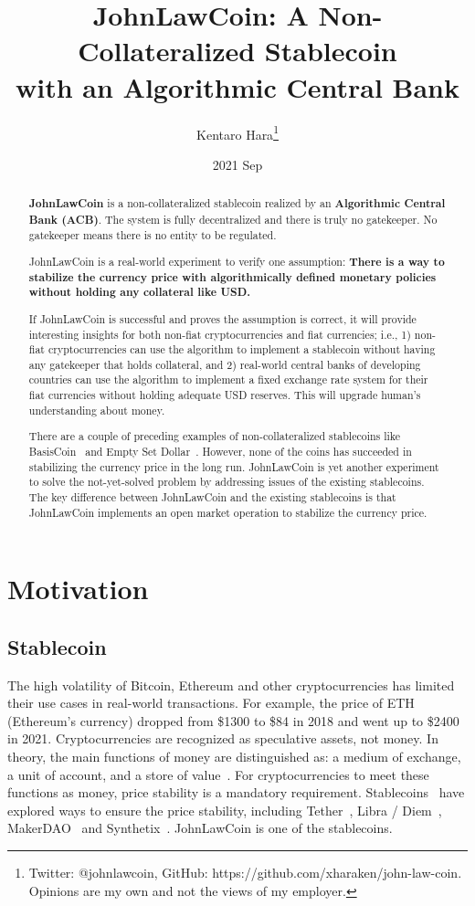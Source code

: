 \documentclass[dvipdfmx,a4paper]{article}
\title{\textbf{JohnLawCoin: A Non-Collateralized Stablecoin\\ with an Algorithmic Central Bank}}
\author{Kentaro Hara\footnote{Twitter: @johnlawcoin, GitHub: https://github.com/xharaken/john-law-coin. Opinions are my own and not the views of my employer.}}
\date{2021 Sep}
\begin{document}
\maketitle

\begin{abstract}

\textbf{JohnLawCoin} is a non-collateralized stablecoin realized by an \textbf{Algorithmic Central Bank (ACB)}. The system is fully decentralized and there is truly no gatekeeper. No gatekeeper means there is no entity to be regulated.

JohnLawCoin is a real-world experiment to verify one assumption: \textbf{There is a way to stabilize the currency price with algorithmically defined monetary policies without holding any collateral like USD.}

If JohnLawCoin is successful and proves the assumption is correct, it will provide interesting insights for both non-fiat cryptocurrencies and fiat currencies; i.e., 1) non-fiat cryptocurrencies can use the algorithm to implement a stablecoin without having any gatekeeper that holds collateral, and 2) real-world central banks of developing countries can use the algorithm to implement a fixed exchange rate system for their fiat currencies without holding adequate USD reserves. This will upgrade human's understanding about money.

There are a couple of preceding examples of non-collateralized stablecoins like BasisCoin~\cite{basiscoin} and Empty Set Dollar~\cite{emptysetdollar}. However, none of the coins has succeeded in stabilizing the currency price in the long run. JohnLawCoin is yet another experiment to solve the not-yet-solved problem by addressing issues of the existing stablecoins. The key difference between JohnLawCoin and the existing stablecoins is that JohnLawCoin implements an open market operation to stabilize the currency price.

\end{abstract}

\section{Motivation}

\subsection{Stablecoin}

The high volatility of Bitcoin, Ethereum and other cryptocurrencies has limited their use cases in real-world transactions. For example, the price of ETH (Ethereum's currency) dropped from \$1300 to \$84 in 2018 and went up to \$2400 in 2021. Cryptocurrencies are recognized as speculative assets, not money. In theory, the main functions of money are distinguished as: a medium of exchange, a unit of account, and a store of value~\cite{davies2010history,ferguson2008ascent}. For cryptocurrencies to meet these functions as money, price stability is a mandatory requirement. Stablecoins~\cite{moin2020sok,klages2020stablecoins} have explored ways to ensure the price stability, including Tether~\cite{tether}, Libra / Diem~\cite{libra}, MakerDAO~\cite{makerdao} and Synthetix~\cite{synthetix}. JohnLawCoin is one of the stablecoins.
\end{document}
